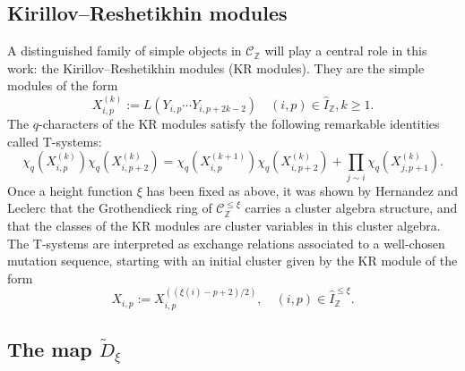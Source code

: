 \documentclass[12pt]{amsart}
\theoremstyle{plain}
\theoremstyle{definition}
\numberwithin{equation}{section}
\newcommand{\IZ}{\widehat{I}_{\mathbb{Z}}}
\newcommand{\IxiZ}{\widehat{I}_{\mathbb{Z}}^{ \leq \xi}}
\newcommand{\tdxi}{\widetilde{D}_{\xi}}
\newcommand{\CZ}{\mathcal{C}_{\mathbb{Z}}}
\newcommand{\CxiZ}{\mathcal{C}_{\mathbb{Z}}^{\leq \xi}}
\begin{document}
  \subsection{Kirillov--Reshetikhin modules}
\label{sec : KR modules}

 A distinguished family of simple objects in $\CZ$ will play a central role in this work: the Kirillov--Reshetikhin modules (KR modules). They are the simple modules of the form 
$$ X_{i,p}^{(k)} := L \left( Y_{i,p} \cdots Y_{i,p+2k-2} \right) \quad (i,p) \in \IZ , k \geq 1 . $$
The $q$-characters of the KR modules satisfy the following remarkable identities called T-systems:
$$ \chi_q(X_{i,p}^{(k)}) \chi_q(X_{i,p+2}^{(k)}) = \chi_q(X_{i,p}^{(k+1)}) \chi_q(X_{i,p+2}^{(k)}) + \prod_{j \sim i} \chi_q(X_{j,p+1}^{(k)}) .  $$
Once a height function $\xi$ has been fixed as above, it was shown by Hernandez and Leclerc \cite{HL16} that the Grothendieck ring of $\CxiZ$ carries a cluster algebra structure, and that the classes of the KR modules are cluster variables in this cluster algebra. The T-systems are interpreted as exchange relations associated to a well-chosen mutation sequence, starting with an initial cluster given by the KR module of the form 
 \begin{equation} \label{eq : initial KRs}
 X_{i,p} := X_{i,p}^{( (\xi(i)-p+2)/2 )}, \quad (i,p) \in \IxiZ . 
 \end{equation}

\subsection{The map \texorpdfstring{$\tdxi$}{tdxi}}
\end{document}

